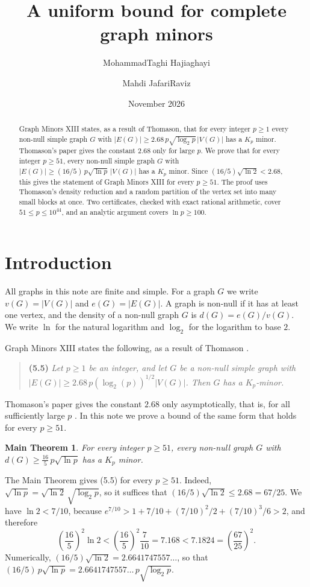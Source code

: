 \documentclass[11pt]{article}
\title{\textbf{A uniform bound for complete graph minors}}
\author{MohammadTaghi Hajiaghayi \and Mahdi JafariRaviz}
\date{November 2026}
\newtheorem*{maintheorem}{Main Theorem}
\begin{document}
\maketitle

\begin{abstract}
Graph Minors XIII states, as a result of Thomason, that for every integer
$p\ge1$ every non-null simple graph $G$ with
$|E(G)|\ge2.68\,p\sqrt{\log_2p}\,|V(G)|$ has a $K_p$ minor. Thomason's paper
gives the constant $2.68$ only for large $p$. We prove that for every integer
$p\ge51$, every non-null simple graph $G$ with
$|E(G)|\ge(16/5)\,p\sqrt{\ln p}\,|V(G)|$ has a $K_p$ minor. Since
$(16/5)\sqrt{\ln2}<2.68$, this gives the statement of Graph Minors XIII for
every $p\ge51$. The proof uses Thomason's density reduction and a random
partition of the vertex set into many small blocks at once. Two certificates,
checked with exact rational arithmetic, cover $51\le p\le10^{44}$, and an
analytic argument covers $\ln p\ge100$.
\end{abstract}

\section{Introduction}\label{sec:intro}

All graphs in this note are finite and simple. For a graph $G$ we write
$v(G)=|V(G)|$ and $e(G)=|E(G)|$. A graph is non-null if it has at least one
vertex, and the density of a non-null graph $G$ is $d(G)=e(G)/v(G)$. We write
$\ln$ for the natural logarithm and $\log_2$ for the logarithm to base $2$.

Graph Minors XIII \cite[(5.5), page~83]{gm13} states the following, as a
result of Thomason \cite{thomason}.
\begin{quote}
\textbf{(5.5)} \emph{Let $p\ge1$ be an integer, and let $G$ be a non-null
simple graph with $|E(G)|\ge2.68\,p(\log_2(p))^{1/2}|V(G)|$. Then $G$ has a
$K_p$-minor.}
\end{quote}
Thomason's paper gives the constant $2.68$ only asymptotically, that is, for
all sufficiently large $p$ \cite[page~264]{thomason}. In this note we prove a
bound of the same form that holds for every $p\ge51$.

\begin{maintheorem}
For every integer $p\ge51$, every non-null graph $G$ with
$d(G)\ge\frac{16}{5}\,p\sqrt{\ln p}$ has a $K_p$ minor.
\end{maintheorem}

The Main Theorem gives (5.5) for every $p\ge51$. Indeed,
$\sqrt{\ln p}=\sqrt{\ln2}\,\sqrt{\log_2p}$, so it suffices that
$(16/5)\sqrt{\ln2}\le2.68=67/25$. We have $\ln2<7/10$, because
$e^{7/10}>1+7/10+(7/10)^2/2+(7/10)^3/6>2$, and therefore
\begin{equation*}
 \left(\frac{16}{5}\right)^2\ln2<\left(\frac{16}{5}\right)^2\frac{7}{10}
 =7.168<7.1824=\left(\frac{67}{25}\right)^2.
\end{equation*}
Numerically, $(16/5)\sqrt{\ln2}=2.6641747557\ldots$, so that
$(16/5)\,p\sqrt{\ln p}=2.6641747557\ldots\,p\sqrt{\log_2p}$.
\end{document}
